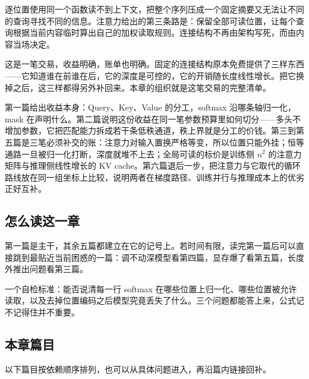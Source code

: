 逐位置使用同一个函数读不到上下文，把整个序列压成一个固定摘要又无法让不同的查询寻找不同的信息。注意力给出的第三条路是：保留全部可读位置，让每个查询根据当前内容临时算出自己的加权读取规则。连接结构不再由架构写死，而由内容当场决定。

这是一笔交易，收益明确，账单也明确。固定的连接结构原本免费提供了三样东西——它知道谁在前谁在后，它的深度是可控的，它的开销随长度线性增长。把它换掉之后，这三样都得另外补回来。本章的组织就是这笔交易的完整清单。

第一篇给出收益本身：Query、Key、Value 的分工，softmax 沿哪条轴归一化，mask 在声明什么。第二篇说明这份收益在同一笔参数预算里如何切分——多头不增加参数，它把匹配能力拆成若干条低秩通道，秩上界就是分工的价钱。第三到第五篇是三笔必须补交的账：注意力对输入置换严格等变，所以位置只能外挂；恒等通路一旦被归一化打断，深度就堆不上去；全局可读的标价是训练侧 \(n^2\) 的注意力矩阵与推理侧线性增长的 KV cache。第六篇退后一步，把注意力与它取代的循环路线放在同一组坐标上比较，说明两者在梯度路径、训练并行与推理成本上的优劣正好互补。

\subsection{怎么读这一章}

第一篇是主干，其余五篇都建立在它的记号上。若时间有限，读完第一篇后可以直接跳到最贴近当前困惑的一篇：调不动深模型看第四篇，显存爆了看第五篇，长度外推出问题看第三篇。

一个自检标准：能否说清每一行 softmax 在哪些位置上归一化、哪些位置被允许读取，以及去掉位置编码之后模型究竟丢失了什么。三个问题都能答上来，公式记不记得住并不重要。

\subsection{本章篇目}

以下篇目按依赖顺序排列，也可以从具体问题进入，再沿篇内链接回补。

